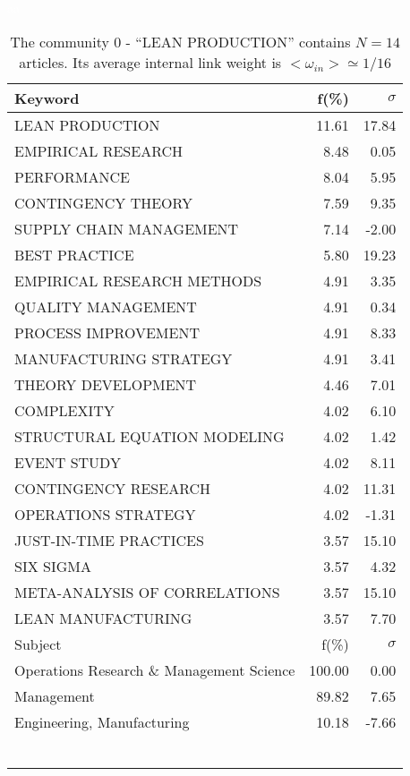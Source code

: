 \documentclass[a4paper,11pt]{report}
\begin{document}
\begin{landscape}
\clearpage

\begin{table}[!ht]
\caption{The community 0 - ``LEAN PRODUCTION'' contains $N = 14$ articles. Its average internal link weight is $<\omega_{in}> \simeq 1/16$ }
\textcolor{white}{aa}\\
{\scriptsize\begin{tabular}{|l r r|}
\hline
Keyword & f(\%) & $\sigma$\\
\hline
LEAN PRODUCTION & 11.61 & 17.84\\
EMPIRICAL RESEARCH & 8.48 & 0.05\\
PERFORMANCE & 8.04 & 5.95\\
CONTINGENCY THEORY & 7.59 & 9.35\\
SUPPLY CHAIN MANAGEMENT & 7.14 & -2.00\\
BEST PRACTICE & 5.80 & 19.23\\
EMPIRICAL RESEARCH METHODS & 4.91 & 3.35\\
QUALITY MANAGEMENT & 4.91 & 0.34\\
PROCESS IMPROVEMENT & 4.91 & 8.33\\
MANUFACTURING STRATEGY & 4.91 & 3.41\\
THEORY DEVELOPMENT & 4.46 & 7.01\\
COMPLEXITY & 4.02 & 6.10\\
STRUCTURAL EQUATION MODELING & 4.02 & 1.42\\
EVENT STUDY & 4.02 & 8.11\\
CONTINGENCY RESEARCH & 4.02 & 11.31\\
OPERATIONS STRATEGY & 4.02 & -1.31\\
JUST-IN-TIME PRACTICES & 3.57 & 15.10\\
SIX SIGMA & 3.57 & 4.32\\
META-ANALYSIS OF CORRELATIONS & 3.57 & 15.10\\
LEAN MANUFACTURING & 3.57 & 7.70\\
\hline
\hline
Subject & f(\%) & $\sigma$\\
\hline
Operations Research \& Management Science & 100.00 & 0.00\\
Management & 89.82 & 7.65\\
Engineering, Manufacturing & 10.18 & -7.66\\
 &  & \\
 &  & \\
 &  & \\
 &  & \\
 &  & \\
 &  & \\

\end{tabular}}
\end{table}
\end{landscape}
\end{document}

